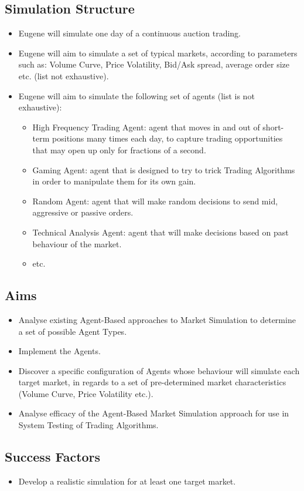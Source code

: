 \subsection{Simulation Structure}
\begin{itemize} 
\item Eugene will simulate one day of a continuous auction trading.
\item Eugene will aim to simulate a set of typical markets, according to parameters such as: Volume Curve, Price Volatility, Bid/Ask spread, average order size etc. (list not exhaustive).
\item Eugene will aim to simulate the following set of agents (list is not exhaustive):
\begin{itemize}
\item High Frequency Trading Agent: agent that moves in and out of short-term positions many times each day, to capture trading opportunities that may open up only for fractions of a second.
\item Gaming Agent: agent that is designed to try to trick Trading Algorithms in order to manipulate them for its own gain.
\item Random Agent: agent that will make random decisions to send mid, aggressive or passive orders.
\item Technical Analysis Agent: agent that will make decisions based on past behaviour of the market.
\item etc.
\end{itemize}
\end{itemize}

\subsection{Aims}
\begin{itemize}
\item Analyse existing Agent-Based approaches to Market Simulation to determine a set of possible Agent Types.
\item Implement the Agents.
\item Discover a specific configuration of Agents whose behaviour will simulate each target market, in regards to a set of pre-determined market characteristics (Volume Curve, Price Volatility etc.).
\item Analyse efficacy of the Agent-Based Market Simulation approach for use in System Testing of Trading Algorithms.
\end{itemize}

\subsection{Success Factors}
\begin{itemize}
\item Develop a realistic simulation for at least one target market.
\end{itemize}
